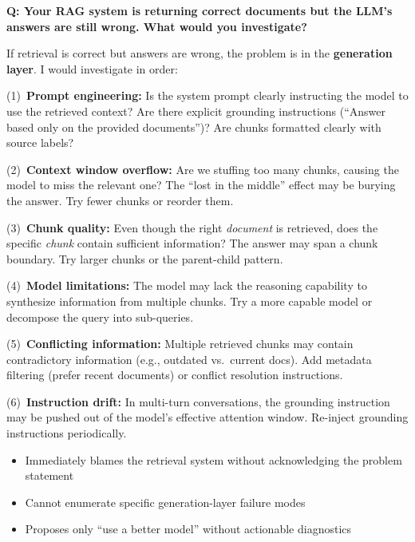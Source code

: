 \begin{interviewq}
\textbf{Q: Your RAG system is returning correct documents but the LLM's
answers are still wrong. What would you investigate?}

 \quad {} \quad \badgefreq{\freqmed}

\stronganswer
If retrieval is correct but answers are wrong, the problem is in the
\textbf{generation layer}.  I would investigate in order:

(1)~\textbf{Prompt engineering:} Is the system prompt clearly instructing the
model to use the retrieved context?  Are there explicit grounding instructions
(``Answer based only on the provided documents'')?  Are chunks formatted
clearly with source labels?

(2)~\textbf{Context window overflow:} Are we stuffing too many chunks,
causing the model to miss the relevant one?  The ``lost in the middle''
effect may be burying the answer.  Try fewer chunks or reorder them.

(3)~\textbf{Chunk quality:} Even though the right \emph{document} is
retrieved, does the specific \emph{chunk} contain sufficient information?
The answer may span a chunk boundary.  Try larger chunks or the parent-child
pattern.

(4)~\textbf{Model limitations:} The model may lack the reasoning capability to
synthesize information from multiple chunks.  Try a more capable model or
decompose the query into sub-queries.

(5)~\textbf{Conflicting information:} Multiple retrieved chunks may contain
contradictory information (e.g., outdated vs.\ current docs).  Add metadata
filtering (prefer recent documents) or conflict resolution instructions.

(6)~\textbf{Instruction drift:} In multi-turn conversations, the grounding
instruction may be pushed out of the model's effective attention window.
Re-inject grounding instructions periodically.

\redflags
\begin{itemize}
    \item Immediately blames the retrieval system without acknowledging the
          problem statement
    \item Cannot enumerate specific generation-layer failure modes
    \item Proposes only ``use a better model'' without actionable diagnostics
\end{itemize}


\end{interviewq}
